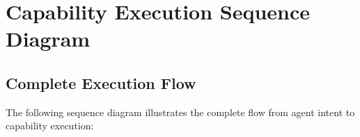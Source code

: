 \appendix

\section{Capability Execution Sequence Diagram}
\label{appendix:sequence}

\subsection{Complete Execution Flow}

The following sequence diagram illustrates the complete flow from agent intent to capability execution:

